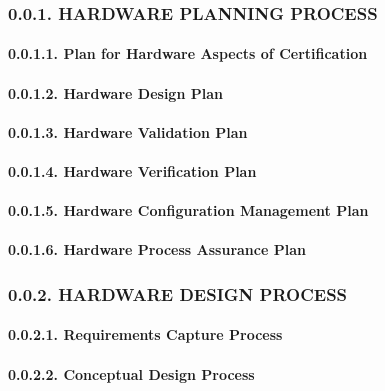 \documentclass[]{article}
\let\oldparagraph\paragraph
\renewcommand{\paragraph}[1]{\oldparagraph{#1}\mbox{}}
\begin{document}
\subsubsection{0.0.1. HARDWARE PLANNING
PROCESS}\label{hardware-planning-process}

\paragraph{0.0.1.1. Plan for Hardware Aspects of
Certification}\label{plan-for-hardware-aspects-of-certification}

\paragraph{0.0.1.2. Hardware Design Plan}\label{hardware-design-plan}

\paragraph{0.0.1.3. Hardware Validation
Plan}\label{hardware-validation-plan}

\paragraph{0.0.1.4. Hardware Verification
Plan}\label{hardware-verification-plan}

\paragraph{0.0.1.5. Hardware Configuration Management
Plan}\label{hardware-configuration-management-plan}

\paragraph{0.0.1.6. Hardware Process Assurance
Plan}\label{hardware-process-assurance-plan}

\subsubsection{0.0.2. HARDWARE DESIGN
PROCESS}\label{hardware-design-process}

\paragraph{0.0.2.1. Requirements Capture
Process}\label{requirements-capture-process}

\paragraph{0.0.2.2. Conceptual Design
Process}\label{conceptual-design-process}
\end{document}
